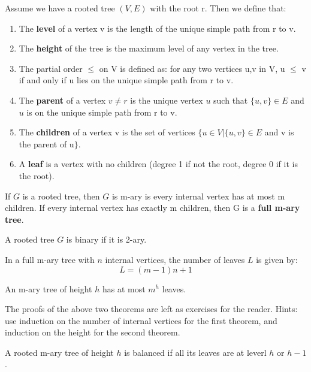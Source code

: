 \begin{definition}
Assume we have a rooted tree $(V,E)$ with the root r. Then we define that:
\begin{enumerate}
    \item The \textbf{level} of a vertex v is the length of the unique simple path from r to v.
    \item The \textbf{height} of the tree is the maximum level of any vertex in the tree.
    \item The partial order $\leq$ on V is defined as: for any two vertices u,v in V, u $\leq$ v if and only if u lies on the unique simple path from r to v.
    \item The \textbf{parent} of a vertex $v \neq r$ is the unique vertex $u$ such that $\{u,v\} \in E$ and $u$ is on the unique simple path from r to v.
    \item The \textbf{children} of a vertex v is the set of vertices $\{u \in V | \{u,v\} \in E$ and v is the parent of u$\}$.
    \item A \textbf{leaf} is a vertex with no children (degree 1 if not the root, degree 0 if it is the root).
\end{enumerate}
\end{definition}

\begin{definition}
If $G$ is a rooted tree, then $G$ is m-ary is every internal vertex has at most m children. If every internal vertex has exactly m children, then G is a \textbf{full m-ary tree}.
\end{definition}

\begin{definition}
A rooted tree $G$ is binary if it is 2-ary.
\end{definition}

\begin{theorem}
In a full m-ary tree with $n$ internal vertices, the number of leaves $L$ is given by:
\[ L = (m-1)n + 1 \]
\end{theorem}

\begin{theorem}
An m-ary tree of height $h$ has at most $m^h$ leaves.
\end{theorem}

The proofs of the above two theorems are left as exercises for the reader. Hints: use induction on the number of internal vertices for the first theorem, and induction on the height for the second theorem.

\begin{definition}
A rooted m-ary tree of height $h$ is balanced if all its leaves are at leverl $h$ or $h-1$.
\end{definition}

